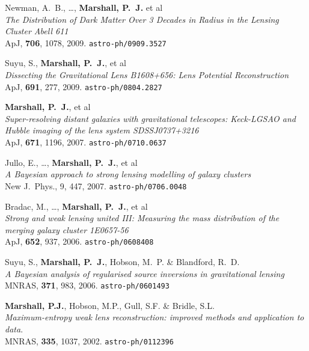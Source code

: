 \begin{revnumerate}

  \item{{Newman}, A.~B., \dots, \textbf{{Marshall}, P.~J.} et al\\
  \textit{The Distribution of Dark Matter Over 3 Decades in Radius in the
  Lensing Cluster Abell 611}\\
  ApJ, \textbf{706}, 1078, 2009.
  \texttt{astro-ph/0909.3527}
  }

  \item{Suyu, S., \textbf{{Marshall}, P.~J.}, et al\\
  \textit{Dissecting the Gravitational Lens B1608+656: Lens Potential Reconstruction}\\
  ApJ, \textbf{691}, 277, 2009.
  \texttt{astro-ph/0804.2827}
  }

  \item{\textbf{{Marshall}, P.~J.}, et al\\
  \textit{Super-resolving distant galaxies with gravitational telescopes: Keck-LGSAO and Hubble imaging of the lens system SDSSJ0737+3216}\\
  ApJ, \textbf{671}, 1196, 2007.
  \texttt{astro-ph/0710.0637}
  }

  \item{Jullo, E., \ldots, \textbf{{Marshall}, P.~J.}, et al\\
  \textit{A Bayesian approach to strong lensing modelling of galaxy clusters}\\
  New J.\ Phys., 9, 447, 2007.
  \texttt{astro-ph/0706.0048}
  }

  \item{Bradac, M., \ldots, \textbf{{Marshall}, P.~J.}, et al\\
  \textit{Strong and weak lensing united III: Measuring the mass distribution of the  merging galaxy cluster 1E0657-56}\\
  ApJ, \textbf{652}, 937, 2006.
  \texttt{astro-ph/0608408}
  }

  \item{Suyu, S., \textbf{{Marshall}, P.~J.}, Hobson, M.~P. \& Blandford, R.~D.\\
  \textit{A Bayesian analysis of regularised source inversions in gravitational lensing}\\
  MNRAS, \textbf{371}, 983, 2006.
  \texttt{astro-ph/0601493}
  }

  \item{\textbf{Marshall, P.J.}, Hobson, M.P., Gull, S.F. \& Bridle, S.L.\\
  \textit{Maximum-entropy weak lens reconstruction: improved methods and application to data}.\\
  MNRAS, \textbf{335}, 1037, 2002.
  \texttt{astro-ph/0112396}
  }

\end{revnumerate}



